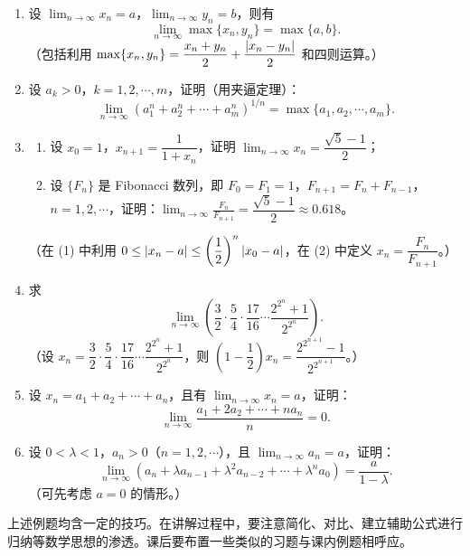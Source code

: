 \begin{enumerate}[label=\arabic*.]
  \item 设 $\displaystyle\lim_{n\to\infty}x_n=a$，$\displaystyle\lim_{n\to\infty}y_n=b$，则有
  \[
    \lim_{n\to\infty}\max\{x_n,y_n\}=\max\{a,b\}.
  \]
  （包括利用 $\max\{x_n,y_n\}=\dfrac{x_n+y_n}{2}+\dfrac{\lvert x_n-y_n\rvert}2$ 和四则运算。）

  \item 设 $a_k>0$，$k=1,2,\cdots,m$，证明（用夹逼定理）：
  \[
    \lim_{n\to\infty}(a_1^n+a_2^n+\cdots+a_m^n)^{1/n}
    =\max\{a_1,a_2,\cdots,a_m\}.
  \]

  \item
  \begin{enumerate}[label=(\arabic*)]
    \item 设 $x_0=1$，$x_{n+1}=\dfrac1{1+x_n}$，证明 $\displaystyle\lim_{n\to\infty}x_n=\dfrac{\sqrt5-1}{2}$；
    \item 设 $\{F_n\}$ 是 Fibonacci 数列，即 $F_0=F_1=1$，$F_{n+1}=F_n+F_{n-1}$，$n=1,2,\cdots$，证明：$\displaystyle\lim_{n\to\infty}\frac{F_n}{F_{n+1}}=\dfrac{\sqrt5-1}{2}\approx0.618$。
  \end{enumerate}
  （在 (1) 中利用 $0\le\lvert x_n-a\rvert\le\left(\dfrac12\right)^n\lvert x_0-a\rvert$，在 (2) 中定义 $x_n=\dfrac{F_n}{F_{n+1}}$。）

  \item 求
  \[
    \lim_{n\to\infty}\left(\frac32\cdot\frac54\cdot\frac{17}{16}\cdots\frac{2^{2^n}+1}{2^{2^n}}\right).
  \]
  （设 $x_n=\dfrac32\cdot\dfrac54\cdot\dfrac{17}{16}\cdots\dfrac{2^{2^n}+1}{2^{2^n}}$，则 $\left(1-\dfrac12\right)x_n=\dfrac{2^{2^{n+1}}-1}{2^{2^{n+1}}}$。）

  \item 设 $x_n=a_1+a_2+\cdots+a_n$，且有 $\displaystyle\lim_{n\to\infty}x_n=a$，证明：
  \[
    \lim_{n\to\infty}\frac{a_1+2a_2+\cdots+na_n}{n}=0.
  \]

  \item 设 $0<\lambda<1$，$a_n>0$（$n=1,2,\cdots$），且 $\displaystyle\lim_{n\to\infty}a_n=a$，证明：
  \[
    \lim_{n\to\infty}(a_n+\lambda a_{n-1}+\lambda^2a_{n-2}+\cdots+\lambda^na_0)
    =\frac a{1-\lambda}.
  \]
  （可先考虑 $a=0$ 的情形。）
\end{enumerate}

\begin{xremark}
上述例题均含一定的技巧。在讲解过程中，要注意简化、对比、建立辅助公式进行归纳等数学思想的渗透。课后要布置一些类似的习题与课内例题相呼应。
\end{xremark}

